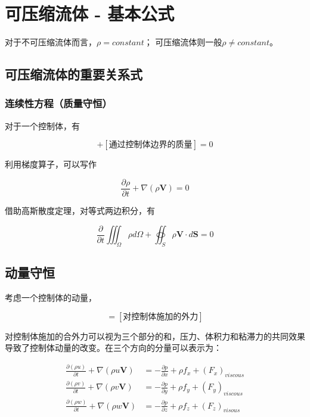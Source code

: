\section{可压缩流体 - 基本公式}

对于不可压缩流体而言，$\rho=constant$；
可压缩流体则一般$\rho\neq constant$。

\subsection{可压缩流体的重要关系式}

\subsubsection{连续性方程（质量守恒）}

对于一个控制体，有

\begin{equation*}
    [\mbox{控制体内的质量改变率}]+[\mbox{通过控制体边界的质量}]=0
\end{equation*}

利用梯度算子，可以写作

\begin{equation*}
    \frac{\partial \rho}{\partial t}+\nabla(\rho \boldsymbol{V})=0
\end{equation*}

借助高斯散度定理，对等式两边积分，有

\begin{equation*}
    \frac{\partial}{\partial t} \iiint_{\Omega} \rho d \Omega+\oiint_{S} \rho \boldsymbol{V} \cdot d \boldsymbol{S}=0
\end{equation*}

\subsection{动量守恒}

考虑一个控制体的动量，

\begin{equation*}
    [\mbox{控制体动量的变化率}]=[\mbox{对控制体施加的外力}]
\end{equation*}

对控制体施加的合外力可以视为三个部分的和，压力、体积力和粘滞力的共同效果导致了控制体动量的改变。在三个方向的分量可以表示为：

\begin{align*}
    \frac{\partial(\rho u)}{\partial t}+\nabla (\rho u \boldsymbol{V})&=-\frac{\partial p}{\partial x}+\rho f_{x}+\left(F_{x}\right)_{viscous}\\
    \frac{\partial(\rho v)}{\partial t}+\nabla (\rho v \boldsymbol{V})&=-\frac{\partial p}{\partial y}+\rho f_{y}+\left(F_{y}\right)_{viscous}\\
    \frac{\partial(\rho w)}{\partial t}+\nabla (\rho w \boldsymbol{V})&=-\frac{\partial p}{\partial z}+\rho f_{z}+\left(F_{z}\right)_{visous}
\end{align*}

